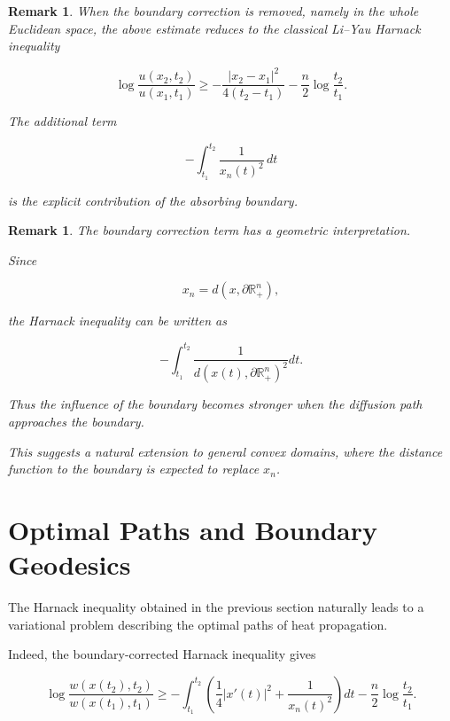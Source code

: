 \documentclass[10pt,a4paper]{amsart}
\newtheorem{remark}[theorem]{Remark}
\begin{document}

\begin{remark}

When the boundary correction is removed, namely in the whole
Euclidean space, the above estimate reduces to the classical
Li--Yau Harnack inequality

\[
\log
\frac{u(x_2,t_2)}
     {u(x_1,t_1)}
\geq
-\frac{|x_2-x_1|^2}{4(t_2-t_1)}
-\frac n2
\log\frac{t_2}{t_1}.
\]

The additional term

\[
-\int_{t_1}^{t_2}
\frac1{x_n(t)^2}\,dt
\]

is the explicit contribution of the absorbing boundary.

\end{remark}



\begin{remark}

The boundary correction term has a geometric interpretation.

Since

\[
x_n=d(x,\partial\mathbb R^n_+),
\]

the Harnack inequality can be written as

\[
-\int_{t_1}^{t_2}
\frac1{
d(x(t),\partial\mathbb R^n_+)^2
}
dt .
\]

Thus the influence of the boundary becomes stronger when the
diffusion path approaches the boundary.

This suggests a natural extension to general convex domains,
where the distance function to the boundary is expected to replace
$x_n$.

\end{remark}


\section{Optimal Paths and Boundary Geodesics}


The Harnack inequality obtained in the previous section naturally
leads to a variational problem describing the optimal paths of heat
propagation.

Indeed, the boundary-corrected Harnack inequality gives

\[
\log
\frac{w(x(t_2),t_2)}
     {w(x(t_1),t_1)}
\geq
-\int_{t_1}^{t_2}
\left(
\frac14 |x'(t)|^2
+
\frac1{x_n(t)^2}
\right)dt
-
\frac n2
\log\frac{t_2}{t_1}.
\]
\end{document}
